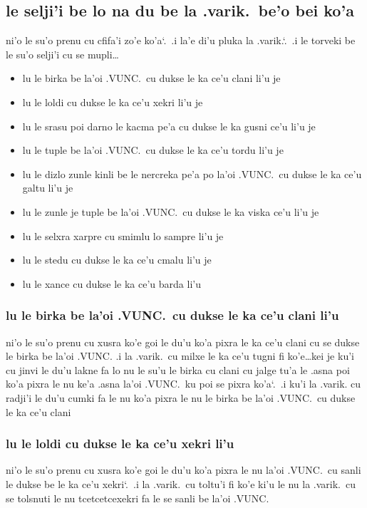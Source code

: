 \documentclass{report}
\newcommand\sds{\spacefactor\sfcode`.\ \space}
\begin{document}
\subsection{le selji'i be lo na du be la .varik.\ be'o bei ko'a}
ni'o le su'o prenu cu cfifa'i zo'e ko'a\sds  .i la'e di'u pluka la .varik.\sds  .i le torveki be le su'o selji'i cu se mupli\ldots
\begin{itemize}
	\item lu le birka be la'oi .VUNC.\ cu dukse le ka ce'u clani li'u je
	\item lu le loldi cu dukse le ka ce'u xekri li'u je
	\item lu le srasu poi darno le kacma pe'a cu dukse le ka gusni ce'u li'u je
	\item lu le tuple be la'oi .VUNC.\ cu dukse le ka ce'u tordu li'u je
	\item lu le dizlo zunle kinli be le nercreka pe'a po la'oi .VUNC.\ cu dukse le ka ce'u galtu li'u je
	\item lu le zunle je tuple be la'oi .VUNC.\ cu dukse le ka viska ce'u li'u je
	\item lu le selxra xarpre cu smimlu lo sampre li'u je
	\item lu le stedu cu dukse le ka ce'u cmalu li'u je
	\item lu le xance cu dukse le ka ce'u barda li'u
\end{itemize}

\subsubsection{lu le birka be la'oi .VUNC.\ cu dukse le ka ce'u clani li'u}
ni'o le su'o prenu cu xusra ko'e goi le du'u ko'a pixra le ka ce'u clani cu se dukse le birka be la'oi .VUNC.  .i la .varik.\ cu milxe le ka ce'u tugni fi ko'e\ldots kei je ku'i cu jinvi le du'u lakne fa lo nu le su'u le birka cu clani cu jalge tu'a le .asna poi ko'a pixra le nu ke'a .asna la'oi .VUNC.\ ku poi se pixra ko'a\sds  .i ku'i la .varik. cu radji'i le du'u cumki fa le nu ko'a pixra le nu le birka be la'oi .VUNC.\ cu dukse le ka ce'u clani

\subsubsection{lu le loldi cu dukse le ka ce'u xekri li'u}
ni'o le su'o prenu cu xusra ko'e goi le du'u ko'a pixra le nu la'oi .VUNC.\ cu sanli le dukse be le ka ce'u xekri\sds  .i la .varik.\ cu toltu'i fi ko'e ki'u le nu la .varik.\ cu se tolsnuti le nu tcetcetcexekri fa le se sanli be la'oi .VUNC.
\end{document}
